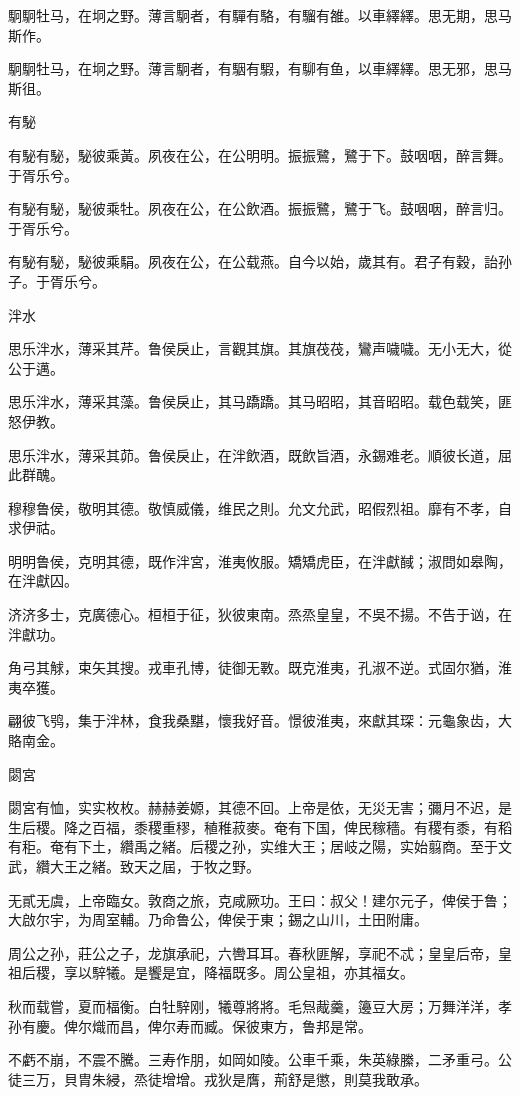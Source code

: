 駉駉牡马，在坰之野。薄言駉者，有驒有駱，有騮有雒。以車繹繹。思无期，思马斯作。

駉駉牡马，在坰之野。薄言駉者，有駰有騢，有駠有鱼，以車繹繹。思无邪，思马斯徂。

有駜

有駜有駜，駜彼乘黃。夙夜在公，在公明明。振振鷺，鷺于下。鼓咽咽，醉言舞。于胥乐兮。

有駜有駜，駜彼乘牡。夙夜在公，在公飲酒。振振鷺，鷺于飞。鼓咽咽，醉言归。于胥乐兮。

有駜有駜，駜彼乘駽。夙夜在公，在公载燕。自今以始，歲其有。君子有穀，詒孙子。于胥乐兮。

泮水

思乐泮水，薄采其芹。鲁侯戾止，言觀其旗。其旗茷茷，鸞声噦噦。无小无大，從公于邁。

思乐泮水，薄采其藻。鲁侯戾止，其马蹻蹻。其马昭昭，其音昭昭。载色载笑，匪怒伊教。

思乐泮水，薄采其茆。鲁侯戾止，在泮飲酒，既飲旨酒，永錫难老。順彼长道，屈此群醜。

穆穆鲁侯，敬明其德。敬慎威儀，维民之則。允文允武，昭假烈祖。靡有不孝，自求伊祜。

明明鲁侯，克明其德，既作泮宮，淮夷攸服。矯矯虎臣，在泮獻馘；淑問如皋陶，在泮獻囚。

济济多士，克廣德心。桓桓于征，狄彼東南。烝烝皇皇，不吳不揚。不告于讻，在泮獻功。

角弓其觩，束矢其搜。戎車孔博，徒御无斁。既克淮夷，孔淑不逆。式固尔猶，淮夷卒獲。

翩彼飞鸮，集于泮林，食我桑黮，懷我好音。憬彼淮夷，來獻其琛：元龜象齿，大賂南金。

閟宮

閟宮有恤，实实枚枚。赫赫姜嫄，其德不回。上帝是依，无災无害；彌月不迟，是生后稷。降之百福，黍稷重穋，稙稚菽麥。奄有下国，俾民稼穡。有稷有黍，有稻有秬。奄有下土，纘禹之緒。后稷之孙，实维大王；居岐之陽，实始翦商。至于文武，纘大王之緒。致天之屆，于牧之野。

无貳无虞，上帝臨女。敦商之旅，克咸厥功。王曰：叔父！建尔元子，俾侯于鲁；大啟尔宇，为周室輔。乃命鲁公，俾侯于東；錫之山川，土田附庸。

周公之孙，莊公之子，龙旗承祀，六轡耳耳。春秋匪解，享祀不忒；皇皇后帝，皇祖后稷，享以騂犧。是饗是宜，降福既多。周公皇祖，亦其福女。

秋而载嘗，夏而楅衡。白牡騂刚，犧尊將將。毛炰胾羹，籩豆大房；万舞洋洋，孝孙有慶。俾尔熾而昌，俾尔寿而臧。保彼東方，鲁邦是常。

不虧不崩，不震不騰。三寿作朋，如岡如陵。公車千乘，朱英綠縢，二矛重弓。公徒三万，貝胄朱綅，烝徒增增。戎狄是膺，荊舒是懲，則莫我敢承。

